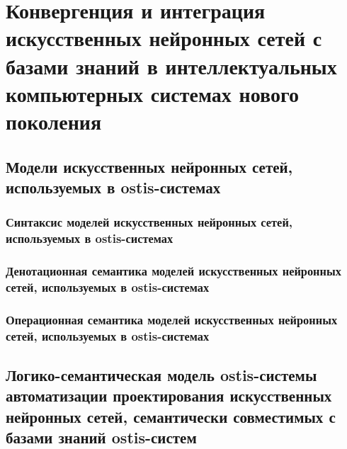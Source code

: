 \chapter{Конвергенция и интеграция искусственных нейронных сетей с базами знаний в интеллектуальных компьютерных системах нового поколения}
\label{chapter_ann}


\section{Модели искусственных нейронных сетей, используемых в ostis-системах}
\subsection{Синтаксис моделей искусственных нейронных сетей, используемых в ostis-системах}
\subsection{Денотационная семантика моделей искусственных нейронных сетей, используемых в ostis-системах}
\subsection{Операционная семантика моделей искусственных нейронных сетей, используемых в ostis-системах}
\section{Логико-семантическая модель ostis-системы автоматизации проектирования искусственных нейронных сетей, семантически совместимых с базами знаний ostis-систем}

%